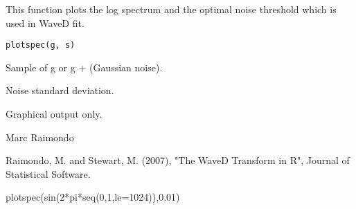 \documentclass{article}
\begin{document}
\begin{Description}\relax
This function plots 
the log spectrum and the optimal noise threshold
which is used in WaveD fit.
\end{Description}
\begin{Usage}
\begin{verbatim}
plotspec(g, s)
\end{verbatim}
\end{Usage}
\begin{Arguments}
\begin{ldescription}
\item[\code{g}] Sample of g or g + (Gaussian noise).
\item[\code{s}] Noise standard deviation.
\end{ldescription}
\end{Arguments}
\begin{Value}
Graphical output only.
\end{Value}
\begin{Author}\relax
Marc Raimondo
\end{Author}
\begin{References}\relax
Raimondo, M. and Stewart, M. (2007),
"The WaveD Transform in R", Journal of Statistical Software.
\end{References}
\begin{SeeAlso}\relax
{}
\end{SeeAlso}
\begin{Examples}
\begin{ExampleCode}plotspec(sin(2*pi*seq(0,1,le=1024)),0.01) \end{ExampleCode}
\end{Examples}
\end{document}
